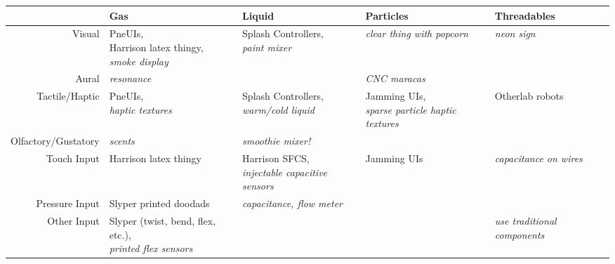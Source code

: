 \begin{table*}[t]
\begin{tabular}{ r || p{3cm} | p{3cm} | p{3cm} | p{3cm} }
  \hline
   & Gas & Liquid & Particles & Threadables\\ \hline \hline
  Visual & \parbox{3cm}{PneUIs, \\Harrison latex thingy, \\ \emph{smoke display}} & \parbox{3cm}{Splash Controllers, \\ \emph{paint mixer}} &\parbox{3cm}{\emph{clear thing with popcorn}} &\parbox{3cm}{\emph{neon sign}} \\ \hline
  Aural & \parbox{3cm}{\emph{resonance}} & \parbox{3cm}{} &\parbox{3cm}{\emph{CNC maracas}} &\parbox{3cm}{} \\ \hline
  Tactile/Haptic & \parbox{3cm}{PneUIs,\\ \emph{haptic textures}} & \parbox{3cm}{Splash Controllers,\\ \emph{warm/cold liquid}} &\parbox{3cm}{Jamming UIs, \\ \emph{sparse particle haptic textures}} &\parbox{3cm}{Otherlab robots} \\ \hline
  Olfactory/Gustatory & \parbox{3cm}{\emph{scents}} & \parbox{3cm}{\emph{smoothie mixer!}} &\parbox{3cm}{} &\parbox{3cm}{} \\ \hline
  Touch Input & \parbox{3cm}{Harrison latex thingy} & \parbox{3cm}{Harrison SFCS, \\ \emph{injectable capacitive sensors}} &\parbox{3cm}{Jamming UIs} &\parbox{3cm}{\emph{capacitance on wires}} \\ \hline
  Pressure Input & \parbox{3cm}{Slyper printed doodads} & \parbox{3cm}{\emph{capacitance, flow meter}} &\parbox{3cm}{} &\parbox{3cm}{} \\ \hline
  Other Input & \parbox{3cm}{Slyper (twist, bend, flex, etc.), \\ \emph{printed flex sensors}} & \parbox{3cm}{} &\parbox{3cm}{} &\parbox{3cm}{\emph{use traditional components}} \\ \hline
\end{tabular}
\end{table*}